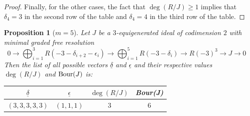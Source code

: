 \documentclass[11pt]{amsart} %
\newtheorem{Proposition}[Theorem]{Proposition}
\theoremstyle{definition}
\begin{document}
\begin{proof}
Finally, for the other cases,  the fact that $\deg(R/J)\geq 1$ implies that $\delta_4=3$ in the second row of the table and $\delta_4=4$ in the third row of the table.
	
	
	
	
		
		
		\end{proof}
	
	\begin{Proposition}[$m=5$]
		Let $J$ be a $3$-equigenerated ideal of codimension $2$ with minimal graded free resolution
		\begin{equation}\label{resm=5}
			0\to \bigoplus_{i=1}^3R(-3-\delta_{i+2}-\epsilon_i)\to \bigoplus_{i=1}^5 R(-3-\delta_i)\to R(-3)^3\to J\to 0
		\end{equation}
	Then the list of all possible vectors $\underline{\delta}$ and $\underline{\epsilon}$ and their respective values $\deg(R/J)$ and ${\rm Bour}(J)$ is:
	\begin{table}[H]
		\renewcommand{\arraystretch}{1.15}
		\begin{center}
			\begin{tabular}{|c|c|c|c|}
				\hline
				$\underline{\delta}$&$\underline{\epsilon}$&$\deg(R/J)$&{\rm Bour}(J)\\
				\hline
			 $(3,3,3,3,3)$&$(1,1,1)$&$3$&$6$\\
			 \hline
			\end{tabular}
		\end{center}
	\end{table}
	
	\end{Proposition}
\end{document}
